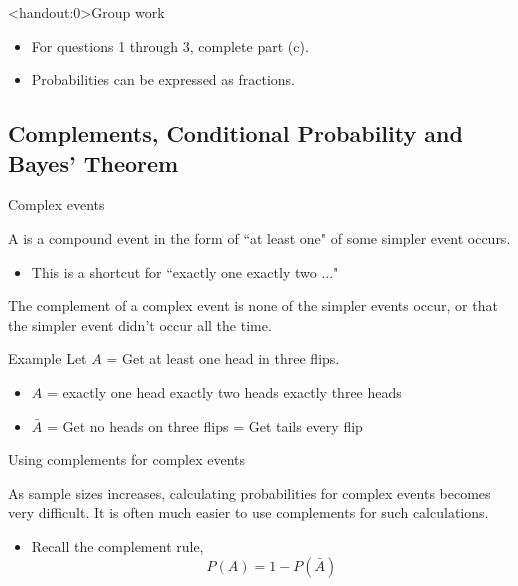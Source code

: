 \documentclass[xcolor=table]{beamer}
\begin{document}
\begin{frame}<handout:0>{Group work}
\begin{block}{}
\large
\begin{itemize}
\item For questions 1 through 3, complete part (c).
\item Probabilities can be expressed as fractions.
\end{itemize}
\end{block}
\end{frame}

\subsection{Complements, Conditional Probability and Bayes' Theorem}

\begin{frame}{Complex events}

\begin{block}{}
{\large A  is a compound event in the form of ``at least one" of some simpler event occurs.}
\begin{itemize}
\pause
\item This is a shortcut for ``exactly one  exactly two ..."
\end{itemize}
\end{block}

\pause

\begin{block}{}
The complement of a complex event is none of the simpler events occur, or that the simpler event didn't occur all the time.
\end{block}

\begin{exampleblock}{Example}
Let $A$ = Get at least one head in three flips.
\begin{itemize}
\pause
\item $A$ = exactly one head  exactly two heads  exactly three heads
\pause
\item $\bar A$ = Get no heads on three flips = Get tails every flip
\end{itemize}
\end{exampleblock}
\end{frame}

\begin{frame}{Using complements for complex events}
\begin{block}{}
As sample sizes increases, calculating probabilities for complex events becomes very difficult. It is often much easier to use complements for such calculations.

\begin{itemize}
\item Recall the complement rule,
\[P(A) = 1 - P(\bar A)\]
\end{itemize}
\end{block}
\end{frame}
\end{document}
